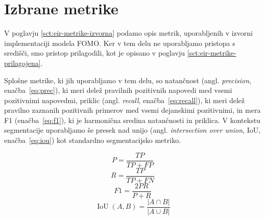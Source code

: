 \documentclass[a4paper,twoside,openright,12pt,slovene]{book}
\begin{document}

    \section{Izbrane metrike} \label{sct:eir-metrike}

        V poglavju \ref{sct:eir-metrike-izvorna} podamo opis metrik, uporabljenih v izvorni implementaciji modela FOMO. Ker v tem delu ne uporabljamo pristopa s središči, smo pristop prilagodili, kot je opisano v poglavju \ref{sct:eir-metrike-prilagojena}.
        
        Splošne metrike, ki jih uporabljamo v tem delu, so natančnost (angl.
        \textit{precision}, enačba~\ref{eq:prec}), ki meri
        delež pravilnih pozitivnih napovedi med vsemi pozitivnimi napovedmi,
        priklic (angl. \textit{recall},
        enačba~\ref{eq:recall}), ki meri delež pravilno
        zaznanih pozitivnih primerov med vsemi dejanskimi pozitivnimi, in mera
        F1 (enačba~\ref{eq:f1}), ki je harmonična sredina
        natančnosti in priklica. V kontekstu segmentacije uporabljamo še presek
        nad unijo (angl. \textit{intersection over union}, IoU,
        enačba~\ref{eq:iou}) kot standardno segmentacijsko
        metriko.

        \begin{equation}
            P = \frac{TP}{TP + FP}
            \label{eq:prec}
        \end{equation}
        \begin{equation}
            R = \frac{TP}{TP + FN}
            \label{eq:recall}
        \end{equation}
        \begin{equation}
            F1 = \frac{2 P R}{P + R}
            \label{eq:f1}
        \end{equation}
        \begin{equation}
            \operatorname{IoU}(A,B) = \frac{|A \cap B|}{|A \cup B|}
            \label{eq:iou}
        \end{equation}
\end{document}
